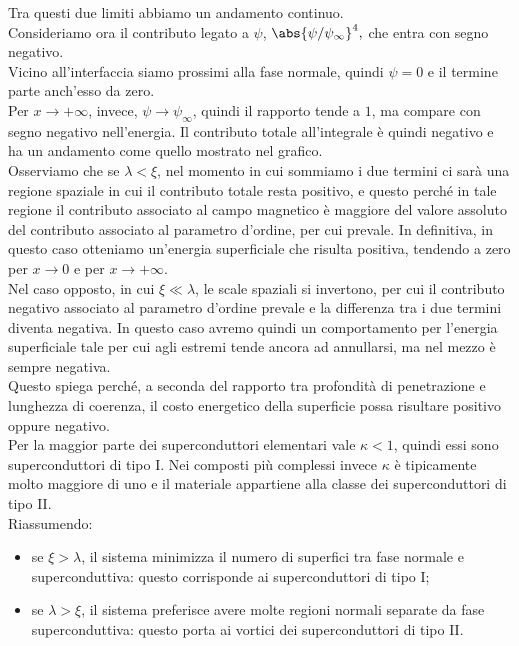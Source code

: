 Tra questi due limiti abbiamo un andamento continuo.\\
Consideriamo ora il contributo legato a $\psi$, $\abs{\psi/\psi_\infty}^4,$ che entra con segno negativo.\\
Vicino all'interfaccia siamo prossimi alla fase normale, quindi $\psi=0$ e il termine parte anch'esso da zero.\\
Per $x \to +\infty$, invece, $\psi \to \psi_\infty$, quindi il rapporto tende a $1$, ma compare con segno negativo nell'energia. Il contributo totale all'integrale è quindi negativo e ha un andamento come quello mostrato nel grafico.\\
Osserviamo che se $\lambda<\xi$, nel momento in cui sommiamo i due termini ci sarà una regione spaziale in cui il contributo totale resta positivo, e questo perché in tale regione il contributo associato al campo magnetico è maggiore del valore assoluto del contributo associato al parametro d'ordine, per cui prevale. In definitiva, in questo caso otteniamo un'energia superficiale che risulta positiva, tendendo a zero per $x\to 0 $ e per $x \to +\infty$.\\
Nel caso opposto, in cui $\xi \ll \lambda$, le scale spaziali si invertono, per cui il contributo negativo associato al parametro d'ordine prevale e la differenza tra i due termini diventa negativa. In questo caso avremo quindi un comportamento per l'energia superficiale tale per cui agli estremi tende ancora ad annullarsi, ma nel mezzo è sempre negativa.\\
Questo spiega perché, a seconda del rapporto tra profondità di penetrazione e lunghezza di coerenza, il costo energetico della superficie possa risultare positivo oppure negativo.\\
Per la maggior parte dei superconduttori elementari vale $\kappa<1$, quindi essi sono superconduttori di tipo I. Nei composti più complessi invece $\kappa$ è tipicamente molto maggiore di uno e il materiale appartiene alla classe dei superconduttori di tipo II.\\
Riassumendo:
\begin{itemize}[leftmargin=0.5cm]
   \item se $\xi>\lambda$, il sistema minimizza il numero di superfici tra fase normale e superconduttiva: questo corrisponde ai superconduttori di tipo I;
   \item se $\lambda>\xi$, il sistema preferisce avere molte regioni normali separate da fase superconduttiva: questo porta ai vortici dei superconduttori di tipo II.
\end{itemize}
